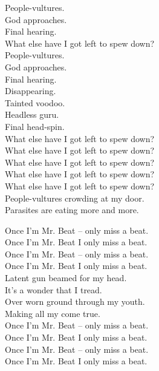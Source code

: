 People-vultures. \\
God approaches. \\
Final hearing. \\
What else have I got left to spew down? \\

People-vultures. \\
God approaches. \\
Final hearing. \\
Disappearing. \\
Tainted voodoo. \\
Headless guru. \\
Final head-spin. \\

What else have I got left to spew down? \\
What else have I got left to spew down? \\
What else have I got left to spew down? \\
What else have I got left to spew down? \\
What else have I got left to spew down? \\

People-vultures crowding at my door. \\
Parasites are eating more and more. \\




Once I'm Mr. Beat -- only miss a beat. \\
Once I'm Mr. Beat I only miss a beat. \\
Once I'm Mr. Beat -- only miss a beat. \\
Once I'm Mr. Beat I only miss a beat. \\

Latent gun beamed for my head. \\
It's a wonder that I tread. \\
Over worn ground through my youth. \\
Making all my  come true. \\

Once I'm Mr. Beat -- only miss a beat. \\
Once I'm Mr. Beat I only miss a beat. \\
Once I'm Mr. Beat -- only miss a beat. \\
Once I'm Mr. Beat I only miss a beat. \\

